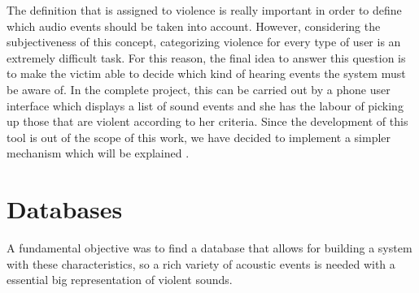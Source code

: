	The definition that is assigned to violence is really important in order to define which audio events should be taken into account. However, considering the subjectiveness of this concept, categorizing violence for every type of user is an extremely difficult task. For this reason, the final idea to answer this question is to make the victim able to decide which kind of hearing events the system must be aware of. In the complete project, this can be carried out by a phone user interface which displays a list of sound events and she has the labour of picking up those that are violent according to her criteria. Since the development of this tool is out of the scope of this work, we have decided to implement a simpler mechanism which will be explained .
	
\section{Databases} 

	A fundamental objective was to find a database that allows for building a system with these characteristics, so a rich variety of acoustic events is needed with a essential big representation of violent sounds.
	
